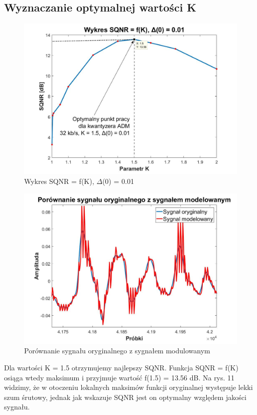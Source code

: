\documentclass[12pt, a4paper, oneside]{article}
\begin{document}
\subsection{Wyznaczanie optymalnej wartości K}
\begin{figure}[h]
\centering
\caption{Wykres SQNR = f(K), $\Delta$(0) = 0.01}
\includegraphics[scale=0.33]{f9.jpg}
\end{figure}
\begin{figure}[h]
\centering
\caption{Porównanie sygnału oryginalnego z sygnałem modulowanym}
\includegraphics[scale=0.33]{f10.jpg}
\end{figure}
\indent\indent Dla wartości K = 1.5 otrzymujemy najlepszy SQNR. Funkcja SQNR = f(K) osiąga wtedy maksimum i przyjmuje wartość f(1.5) = 13.56 dB. Na rys. 11 widzimy, że w otoczeniu lokalnych maksimów funkcji oryginalnej występuje lekki szum śrutowy, jednak jak wskazuje SQNR jest on optymalny względem jakości sygnału.
\clearpage
\end{document}
